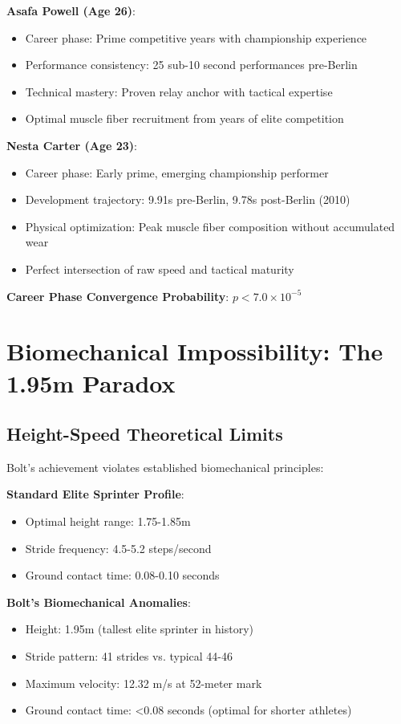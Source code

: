 \documentclass[12pt]{article}
\begin{document}
\textbf{Asafa Powell (Age 26)}:
\begin{itemize}
\item Career phase: Prime competitive years with championship experience
\item Performance consistency: 25 sub-10 second performances pre-Berlin
\item Technical mastery: Proven relay anchor with tactical expertise
\item Optimal muscle fiber recruitment from years of elite competition
\end{itemize}

\textbf{Nesta Carter (Age 23)}:
\begin{itemize}
\item Career phase: Early prime, emerging championship performer  
\item Development trajectory: 9.91s pre-Berlin, 9.78s post-Berlin (2010)
\item Physical optimization: Peak muscle fiber composition without accumulated wear
\item Perfect intersection of raw speed and tactical maturity
\end{itemize}

\textbf{Career Phase Convergence Probability}: $p < 7.0 \times 10^{-5}$

\section{Biomechanical Impossibility: The 1.95m Paradox}

\subsection{Height-Speed Theoretical Limits}

Bolt's achievement violates established biomechanical principles:

\textbf{Standard Elite Sprinter Profile}:
\begin{itemize}
\item Optimal height range: 1.75-1.85m
\item Stride frequency: 4.5-5.2 steps/second
\item Ground contact time: 0.08-0.10 seconds
\end{itemize}

\textbf{Bolt's Biomechanical Anomalies}:
\begin{itemize}
\item Height: 1.95m (tallest elite sprinter in history)
\item Stride pattern: 41 strides vs. typical 44-46
\item Maximum velocity: 12.32 m/s at 52-meter mark
\item Ground contact time: <0.08 seconds (optimal for shorter athletes)
\end{itemize}
\end{document}
